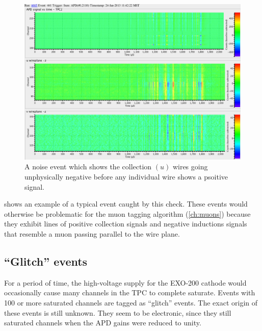 \documentclass[herrin-thesis.tex]{subfiles}
\begin{document}
\begin{figure}[tbp]
\centering
\includegraphics[width=\columnwidth]{./plots/noise_eventdisplay_run_4685_ev_0441.png}
\caption[Collection wires negative noise]{A noise event which shows the collection \((u)\) wires going unphysically negative before any individual wire shows a psoitive signal.}
\label{fig:noise_sum_u_neg}
\end{figure}

 shows an example of a typical event caught by this check. These events would otherwise be problematic for the muon tagging algorithm (\cref{ch:muons}) because they exhibit lines of positive collection signals and negative inductions signals that resemble a muon passing parallel to the wire plane.

\subsection{``Glitch'' events}
For a period of time, the high-voltage supply for the EXO-200 cathode would occasionally cause many channels in the TPC to complete saturate. Events with 100 or more saturated channels are tagged as ``glitch'' events. The exact origin of these events is still unknown. They seem to be electronic, since they still saturated channels when the APD gains were reduced to unity.
\end{document}
